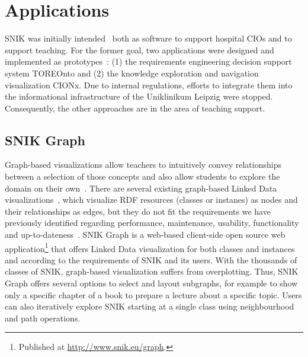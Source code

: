 \documentclass[conference]{IEEEtran}
\newcommand{\citep}{\cite}%
\begin{document}
\section{Applications}
SNIK was initially intended~\citep{domaene} both as  software to support hospital CIOs and to support teaching.
For the former goal, two applications were designed and implemented as prototypes~\citep{toreonto}: (1) the requirements engineering decision support system TOREOnto and (2) the knowledge exploration and navigation visualization CIONx.
Due to internal regulations, efforts to integrate them into the informational infrastructure of the Uniklinikum Leipzig were stopped.
Consequently, the other approaches are in the area of teaching support.


\subsection{SNIK Graph}\label{sec:snik-graph}

Graph-based visualizations allow teachers to intuitively convey relationships between a selection of those concepts and also allow students to explore the domain on their own~\cite{ontologybased}.
There are several existing graph-based Linked Data visualizations~\cite{linkeddatavisualization}, which visualize RDF resources (classes or instanes) as nodes and their relationships as edges, but they do not fit the requirements we have previously identified regarding performance, maintenance, usability, functionality and up-to-dateness~\cite{visualizationoflargeontologies}.
SNIK Graph is a web-based client-side open source web application\footnote{Published at \url{http://www.snik.eu/graph}.} that offers Linked Data visualization for both classes and instances and according to the requirements of SNIK and its users.
With the thousands of classes of SNIK, graph-based visualization suffers from overplotting.
Thus, SNIK Graph offers several options to select and layout subgraphs, for example to show only a specific chapter of a book to prepare a lecture about a specific topic.
Users can also iteratively explore SNIK starting at a single class using neighbourhood and path operations. %
\end{document}
